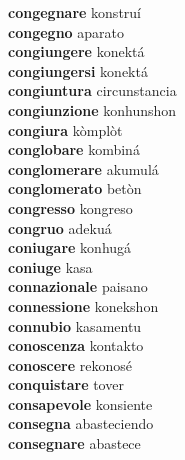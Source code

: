\textbf{congegnare } konstruí \\
\textbf{congegno } aparato \\
\textbf{congiungere } konektá \\
\textbf{congiungersi } konektá \\
\textbf{congiuntura } circunstancia \\
\textbf{congiunzione } konhunshon \\
\textbf{congiura } kòmplòt \\
\textbf{conglobare } kombiná \\
\textbf{conglomerare } akumulá \\
\textbf{conglomerato } betòn \\
\textbf{congresso } kongreso \\
\textbf{congruo } adekuá \\
\textbf{coniugare } konhugá \\
\textbf{coniuge } kasa \\
\textbf{connazionale } paisano \\
\textbf{connessione } konekshon \\
\textbf{connubio } kasamentu \\
\textbf{conoscenza } kontakto \\
\textbf{conoscere } rekonosé \\
\textbf{conquistare } tover \\
\textbf{consapevole } konsiente \\
\textbf{consegna } abasteciendo \\
\textbf{consegnare } abastece \\
